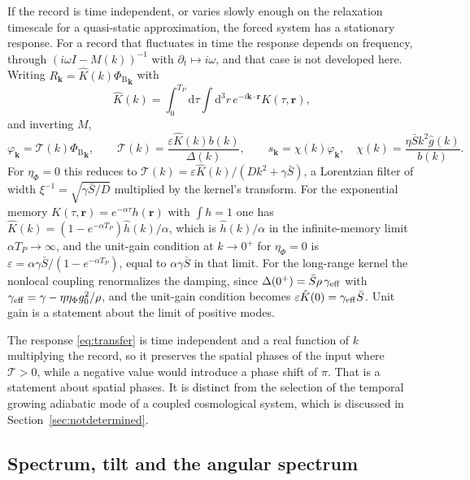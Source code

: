 \documentclass[11pt]{article}
\theoremstyle{definition}
\theoremstyle{remark}
\newcommand{\dd}{\mathrm{d}}
\newcommand{\kk}{\mathbf{k}}
\newcommand{\Phib}{{\Phi_{\mathrm{B}}}}
\newcommand{\TT}{\mathcal{T}}
\newcommand{\Sb}{\bar{S}}
\begin{document}
If the record is time independent, or varies slowly enough on the relaxation timescale for a quasi-static approximation, the forced system has a stationary response. For a record that fluctuates in time the response depends on frequency, through $(i\omega I-M(k))^{-1}$ with $\partial_t\mapsto i\omega$, and that case is not developed here. Writing $R_{\mathbf k}=\hat K(k)\Phib_{\mathbf k}$ with
\begin{equation}
\hat K(k)=\int_0^{T_P}\dd\tau\int\dd^3r\,e^{-i\kk\cdot\mathbf r}K(\tau,\mathbf r),
\end{equation}
and inverting $M$,
\begin{equation}
\varphi_{\mathbf k}=\TT(k)\Phib_{\mathbf k},\qquad\TT(k)=\frac{\varepsilon\hat K(k)b(k)}{\Delta(k)},\qquad s_{\mathbf k}=\chi(k)\varphi_{\mathbf k},\quad\chi(k)=\frac{\eta\Sb k^2\hat g(k)}{b(k)}.
\label{eq:transfer}
\end{equation}
For $\eta_\Phi=0$ this reduces to $\TT(k)=\varepsilon\hat K(k)/(Dk^2+\gamma\Sb)$, a Lorentzian filter of width $\xi^{-1}=\sqrt{\gamma\Sb/D}$ multiplied by the kernel's transform. For the exponential memory $K(\tau,\mathbf r)=e^{-\alpha\tau}h(\mathbf r)$ with $\int h=1$ one has $\hat K(k)=(1-e^{-\alpha T_P})\hat h(k)/\alpha$, which is $\hat h(k)/\alpha$ in the infinite-memory limit $\alpha T_P\to\infty$, and the unit-gain condition at $k\to0^+$ for $\eta_\Phi=0$ is $\varepsilon=\alpha\gamma\Sb/(1-e^{-\alpha T_P})$, equal to $\alpha\gamma\Sb$ in that limit. For the long-range kernel the nonlocal coupling renormalizes the damping, since $\Delta(0^+)=\Sb\rho\,\gamma_{\rm eff}$ with $\gamma_{\rm eff}=\gamma-\eta\eta_\Phi g_0^2/\rho$, and the unit-gain condition becomes $\varepsilon\hat K(0)=\gamma_{\rm eff}\Sb$. Unit gain is a statement about the limit of positive modes.

The response \eqref{eq:transfer} is time independent and a real function of $k$ multiplying the record, so it preserves the spatial phases of the input where $\TT>0$, while a negative value would introduce a phase shift of $\pi$. That is a statement about spatial phases. It is distinct from the selection of the temporal growing adiabatic mode of a coupled cosmological system, which is discussed in Section~\ref{sec:notdetermined}.

\subsection{Spectrum, tilt and the angular spectrum}
\end{document}
